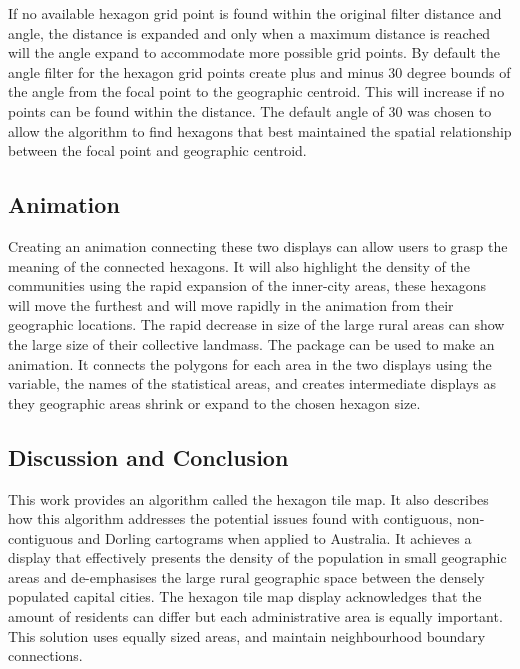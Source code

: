 If no available hexagon grid point is found within the original filter
distance and angle, the distance is expanded and only when a maximum
distance is reached will the angle expand to accommodate more possible
grid points. By default the angle filter for the hexagon grid points
create plus and minus 30 degree bounds of the angle from the focal point
to the geographic centroid. This will increase if no points can be found
within the  distance. The default angle of 30 was
chosen to allow the algorithm to find hexagons that best maintained the
spatial relationship between the focal point and geographic centroid.

\hypertarget{animation}{%
\subsection{Animation}\label{animation}}

Creating an animation connecting these two displays can allow users to
grasp the meaning of the connected hexagons. It will also highlight the
density of the communities using the rapid expansion of the inner-city
areas, these hexagons will move the furthest and will move rapidly in
the animation from their geographic locations. The rapid decrease in
size of the large rural areas can show the large size of their
collective landmass. The  \citep{gganimate} package can
be used to make an animation. It connects the polygons for each area in
the two displays using the  variable, the names of the
statistical areas, and creates intermediate displays as they geographic
areas shrink or expand to the chosen hexagon size.

\hypertarget{conclusion-03}{%
\subsection{Discussion and Conclusion}\label{conclusion-03}}

This work provides an algorithm called the hexagon tile map. It also
describes how this algorithm addresses the potential issues found with
contiguous, non-contiguous and Dorling cartograms when applied to
Australia. It achieves a display that effectively presents the density
of the population in small geographic areas and de-emphasises the large
rural geographic space between the densely populated capital cities. The
hexagon tile map display acknowledges that the amount of residents can
differ but each administrative area is equally important. This solution
uses equally sized areas, and maintain neighbourhood boundary
connections.


